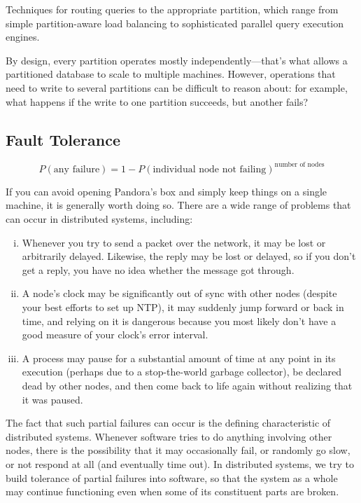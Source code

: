 \documentclass{article}
\begin{document}
    Techniques for routing queries to the appropriate partition, which range from simple partition-aware load balancing to sophisticated parallel query execution engines.
    
    By design, every partition operates mostly independently—that’s what allows a partitioned database to scale to multiple machines. However, operations that need to write to several partitions can be difficult to reason about: for example, what happens if the write to one partition succeeds, but another fails? 

    \subsection{Fault Tolerance }
    
    \vspace{8pt}
    \[
        P(\text{any failure}) = 1- P(\text{individual node not failing})^{\text{number of nodes} } 
    \]
    
    If you can avoid opening Pandora’s box and simply keep things on a single machine, it is generally worth doing so. There are a wide range of problems that can occur in distributed systems, including:
    
    \begin{enumerate}[i.]
        \item Whenever you try to send a packet over the network, it may be lost or arbitrarily   delayed. Likewise, the reply may be lost or delayed, so if you don’t get a reply, you have no idea whether the message got through.
        \item A node’s clock may be significantly out of sync with other nodes (despite your   best efforts to set up NTP), it may suddenly jump forward or back in time, and relying on it is dangerous because you most likely don’t have a good measure of your clock’s error interval.
        \item A process may pause for a substantial amount of time at any point in its execution (perhaps due to a stop-the-world garbage collector), be declared dead by other nodes, and then come back to life again without realizing that it was paused.
    \end{enumerate}

    The fact that such partial failures can occur is the defining characteristic of distributed systems. Whenever software tries to do anything involving other nodes, there is the possibility that it may occasionally fail, or randomly go slow, or not respond at all (and eventually time out). In distributed systems, we try to build tolerance of partial failures into software, so that the system as a whole may continue functioning even when some of its constituent parts are broken.
    
\end{document}
